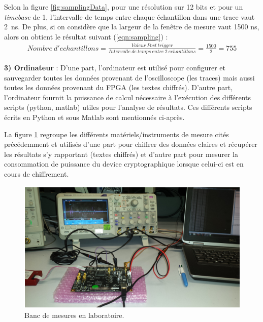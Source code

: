 \documentclass[oneside]{book}
\begin{document}
\hspace{-0.5cm}Selon la figure \ref{fig:samplingData}, pour une résolution sur 12 bits et pour un \textit{timebase} de 1, l'intervalle de temps entre chaque échantillon dans une trace vaut \SI{2}{\nano\second}. De plus, si on considère que la largeur de la fenêtre de mesure vaut 1500 ns, alors on obtient le résultat suivant (\ref{eqn:sampling}) : 
\begin{gather}
	 Nombre \ d'echantillons = \frac{Valeur \ Post \ trigger}{Intervalle \ de \ temps \ entre \ 2 \ echantillons} = \frac{1500}{2} = 755 \label{eqn:sampling}
\end{gather}

\hspace{-0.5cm}\textbf{3) Ordinateur} : D'une part, l'ordinateur est utilisé pour configurer et sauvegarder toutes les données provenant de l'oscilloscope (les traces) mais aussi toutes les données provenant du FPGA (les textes chiffrés). D'autre part, l'ordinateur fournit la puissance de calcul nécessaire à l'exécution des différents scripts (python, matlab) utiles pour l'analyse de résultats. Ces différents scripts écrits en Python et sous Matlab sont mentionnés ci-après.

\newpage

\hspace{-0.5cm}La figure \ref{fig:matos} regroupe les différents matériels/instruments de mesure cités précédemment et utilisés d'une part pour chiffrer des données claires et récupérer les résultats s'y rapportant (textes chiffrés) et d'autre part pour mesurer la consommation de puissance du device cryptographique lorsque celui-ci est en cours de chiffrement.
\begin{figure}[htbp]
    \centering
    \includegraphics[scale=0.35]{image/matos}
    \caption{Banc de mesures en laboratoire.}
    \label{fig:matos} 
\end{figure}
\end{document}
